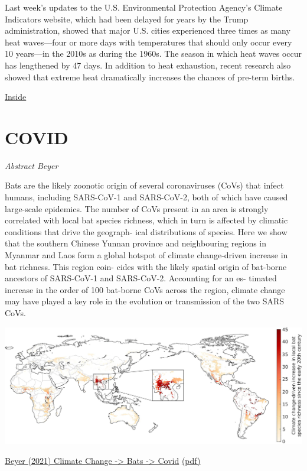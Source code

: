 \documentclass[
]{book}
\begin{document}
Last week's updates to the U.S. Environmental Protection Agency's Climate Indicators website, which had been delayed for years by the Trump administration, showed that major U.S. cities experienced three times as many heat waves---four or more days with temperatures that should only occur every 10 years---in the 2010s as during the 1960s. The season in which heat waves occur has lengthened by 47 days. In addition to heat exhaustion, recent research also showed that extreme heat dramatically increases the chances of pre-term births.

\href{https://insideclimatenews.org/news/16052021/extreme-heat-risks-climate-change/}{Inside}

\hypertarget{covid}{%
\section{COVID}\label{covid}}

\emph{Abstract Beyer}

Bats are the likely zoonotic origin of several coronaviruses (CoVs) that infect humans, including SARS-CoV-1 and
SARS-CoV-2, both of which have caused large-scale epidemics. The number of CoVs present in an area is strongly
correlated with local bat species richness, which in turn is affected by climatic conditions that drive the geograph-
ical distributions of species. Here we show that the southern Chinese Yunnan province and neighbouring regions
in Myanmar and Laos form a global hotspot of climate change-driven increase in bat richness. This region coin-
cides with the likely spatial origin of bat-borne ancestors of SARS-CoV-1 and SARS-CoV-2. Accounting for an es-
timated increase in the order of 100 bat-borne CoVs across the region, climate change may have played a key role
in the evolution or transmission of the two SARS CoVs.

\includegraphics{fig/climate_change_bats_covid.jpg}

\href{https://www.sciencedirect.com/science/article/pii/S0048969721004812}{Beyer (2021) Climate Change -\textgreater{} Bats -\textgreater{} Covid}
\href{pdf/Beyer_2010_Climate_Change_Bat_Covid.pdf}{(pdf)}
\end{document}
